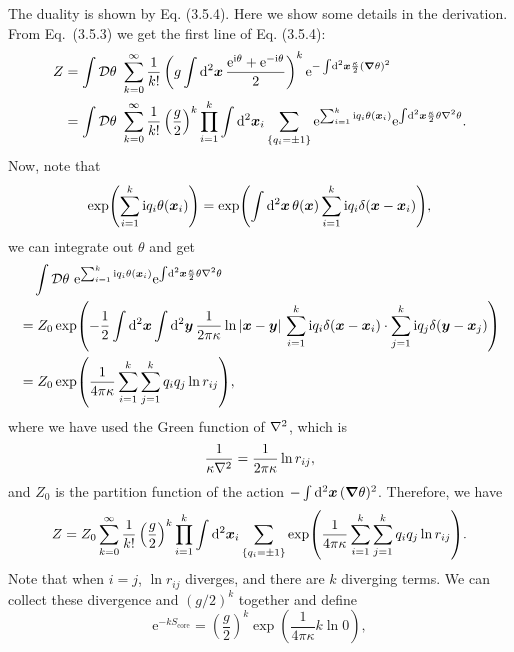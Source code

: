 \documentclass[hyperref, a4paper]{article}
\newcommand*{\ii}{\mathrm{i}}
\newcommand*{\ee}{\mathrm{e}}
\newcommand*{\fd}[1]{\mathcal{D} #1}
\begin{document}
The duality is shown by Eq. (3.5.4). Here we show some details in the derivation.  
From Eq.~(3.5.3) we get the first line of Eq. (3.5.4): 
\[
    \begin{aligned}
        Z &= \int \fd{\theta} \  \sum_{k=0}^\infty \frac{1}{k!} \left( g \int \dd[2]{\vb*{x}} \frac{\ee^{\ii \theta} + \ee^{- \ii \theta}}{2} \right)^k \ee^{- \int \dd[2]{\vb*{x}} \frac{\kappa}{2} (\grad \theta)^2} \\
        &= \int \fd{\theta} \  \sum_{k=0}^\infty \frac{1}{k!} \left(\frac{g}{2}\right)^k \prod_{i=1}^k \int \dd[2]{\vb*{x}_i} \sum_{\{q_i = \pm 1 \}} \ee^{\sum_{i=1}^k \ii q_i \theta(\vb*{x}_i)} \ee^{ \int \dd[2]{\vb*{x}} \frac{\kappa}{2} \theta \laplacian \theta} .
    \end{aligned}
\]
Now, note that 
\[
    \exp(\sum_{i=1}^k \ii q_i \theta(\vb*{x}_i)) = \exp(\int \dd[2]{\vb*{x}} \theta(\vb*{x}) \sum_{i=1}^k \ii q_i \delta(\vb*{x} - \vb*{x}_i)),
\]
we can integrate out $\theta$ and get 
\[
    \begin{aligned}
        &\quad \int \fd{\theta} \ \ee^{\sum_{i=1}^k \ii q_i \theta(\vb*{x}_i)} \ee^{ \int \dd[2]{\vb*{x}} \frac{\kappa}{2} \theta \laplacian \theta} \\
        &= Z_0 \exp(- \frac{1}{2} \int \dd[2]{\vb*{x}} \int \dd[2]{\vb*{y}} \frac{1}{2 \pi \kappa} \ln \abs*{\vb*{x} - \vb*{y}} \sum_{i=1}^k \ii q_i \delta(\vb*{x} - \vb*{x}_i) \cdot \sum_{j=1}^k \ii q_j \delta(\vb*{y} - \vb*{x}_j)) \\
        &= Z_0 \exp(\frac{1}{4 \pi \kappa} \sum_{i=1}^k \sum_{j=1}^k q_i q_j \ln r_{ij}),
    \end{aligned}
\]
where we have used the Green function of $\laplacian$, which is 
\[
    \frac{1}{\kappa \laplacian} = \frac{1}{2 \pi \kappa} \ln r_{ij},
\]
and $Z_0$ is the partition function of the action $- \int \dd[2]{\vb*{x}} (\grad \theta)^2$. 
Therefore, we have 
\begin{equation}
    Z = Z_0 \sum_{k=0}^\infty \frac{1}{k!} \left(\frac{g}{2}\right)^k \prod_{i=1}^k \int \dd[2]{\vb*{x}_i} 
    \sum_{\{q_i = \pm 1 \}} \exp(\frac{1}{4 \pi \kappa} \sum_{i=1}^k \sum_{j=1}^k q_i q_j \ln r_{ij}).
    \label{eq:proto-sine-gordon-to-xy-1}
\end{equation}
Note that when $i=j$, $\ln r_{ij}$ diverges, and there are $k$ diverging terms. We can collect these divergence 
and $(g/2)^k$ together and define 
\begin{equation}
    \ee^{-k S_\text{core}} = \left(\frac{g}{2}\right)^k \exp(\frac{1}{4 \pi \kappa} k \ln 0 ),
\end{equation}  
\end{document}

